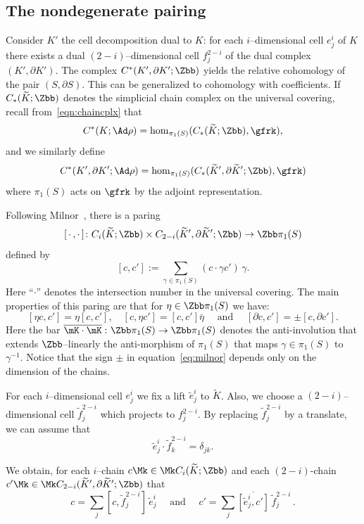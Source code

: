 \subsection{The nondegenerate pairing} Consider $K'$ the cell decomposition dual to $K$: for each $i$--dimensional cell $e^i_j$ of $K$ there exists a dual $(2-i)$--dimensional cell $f^{2-i}_j$ of the dual complex $(K',\partial K')$. The complex $C^*(K',\partial K';\Zbb)$ yields the relative cohomology of the pair $(S,\partial S)$. This can be generalized to cohomology with coefficients. If $C_*(\widetilde K;\Zbb)$ denotes the simplicial chain complex on the universal covering, recall from~\eqref{eqn:chaincplx} that
\[
C^*(K;\Ad\rho)=\hom_{\pi_1(S)}(C_*(\widetilde K;\Zbb), \gfrk),
\]
and we similarly define
\[
C^*(K',\partial K';\Ad\rho)=\hom_{\pi_1(S)}(C_*(\widetilde K',\partial\widetilde K' ;\Zbb), \gfrk)
\]
where $\pi_1(S)$ acts on $ \gfrk$ by the adjoint representation.


Following Milnor~\cite{MilnorDuality}, there is a paring
\[
[\,\cdot\,,\cdot\,]\colon C_i(\widetilde K;\Zbb)\times C_{2-i}(\widetilde K',\partial\widetilde K' ;\Zbb)\to \Zbb\pi_1(S)
\]
defined by
\[
[c,c'] := \sum_{\gamma\in\pi_1(S)} (c\cdot \gamma c')\,\gamma.
\]
Here ``$\cdot$'' denotes the intersection number in the universal covering. The main properties of this paring are that for $\eta\in\Zbb\pi_1(S)$ we have:
\begin{equation}\label{eq:milnor}
[\eta c,c'] = \eta [c,c'], \quad [c,\eta c'] = [c,c'] \bar \eta
\quad\text{ and }\quad [\partial c,c'] = \pm [c,\partial c'].
\end{equation}
Here the bar $\overline{\mK\cdot\vphantom{t}\mK}\,\colon\Zbb\pi_1(S)\to \Zbb\pi_1(S) $ denotes the anti-involution that extends $\Zbb$--linearly the anti-morphism of $\pi_1(S)$ that maps $\gamma\in\pi_1(S)$ to $\gamma^{-1}$. Notice that the sign $\pm$ in equation~\eqref{eq:milnor} depends only on the dimension of the chains.

For each $i$--dimensional cell $e^i_j$ we fix a lift $\tilde e^i_j$ to $\widetilde K$. Also, we choose a $(2-i)$--dimensional cell $\tilde f^{2-i}_j$ which projects to $f^{2-i}_j$. By replacing $\tilde f^{2-i}_j$ by a translate, we can assume that
\[
\tilde e^i_j \cdot \tilde f^{2-i}_k = \delta_{jk}.
\]

We obtain, for each $i$--chain $c\Mk\in\Mk C_i(\widetilde K ;\Zbb)$ and each $(2-i)$-chain $c'\Mk\in\Mk C_{2-i}(\widetilde K',\partial\widetilde K' ; \Zbb)$ that
\[
c = \sum_j [c, \tilde f^{2-i}_j] \,\tilde e^i_j
\quad\text{ and }\quad c' = \sum_j \overline{[\tilde e^i_j, c']}\, \tilde f^{2-i}_j\,.
\]


